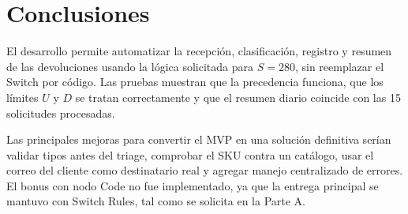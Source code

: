 \documentclass[11pt,a4paper]{article}
\begin{document}
\section{Conclusiones}

El desarrollo permite automatizar la recepción, clasificación, registro y resumen de las devoluciones usando la lógica solicitada para $S=280$, sin reemplazar el Switch por código. Las pruebas muestran que la precedencia funciona, que los límites $U$ y $D$ se tratan correctamente y que el resumen diario coincide con las 15 solicitudes procesadas.

Las principales mejoras para convertir el MVP en una solución definitiva serían validar tipos antes del triage, comprobar el SKU contra un catálogo, usar el correo del cliente como destinatario real y agregar manejo centralizado de errores. El bonus con nodo Code no fue implementado, ya que la entrega principal se mantuvo con Switch Rules, tal como se solicita en la Parte A.
\end{document}

